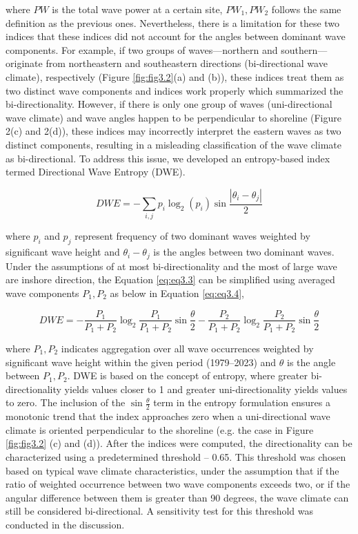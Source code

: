 where $PW$ is the total wave power at a certain site, $PW_1, PW_2$ follows the
same definition as the previous ones. Nevertheless, there is a limitation for
these two indices that these indices did not account for the angles between
dominant wave components. For example, if two groups of waves—northern and
southern—originate from northeastern and southeastern directions (bi-directional
wave climate), respectively (Figure \ref{fig:fig3.2}(a) and (b)), these indices
treat them as two distinct wave components and indices work properly which
summarized the bi-directionality. However, if there is only one group of waves
(uni-directional wave climate) and wave angles happen to be perpendicular to
shoreline (Figure 2(c) and 2(d)), these indices may incorrectly interpret the
eastern waves as two distinct components, resulting in a misleading
classification of the wave climate as bi-directional. To address this issue, we
developed an entropy-based index termed Directional Wave Entropy (DWE). 

\begin{equation}
DWE = -\sum_{i,j}p_i\log_2(p_i)\sin{\frac{|\theta_i - \theta_j|}{2}}
\label{eq:eq3.3}
\end{equation}

where $p_i$ and $p_j$ represent frequency of two dominant waves weighted by
significant wave height and $\theta_i-\theta_j$ is the angles between two
dominant waves. Under the assumptions of at most bi-directionality and the most
of large wave are inshore direction, the Equation \ref{eq:eq3.3} can be
simplified using averaged wave components $P_1,P_2$ as below in Equation
\ref{eq:eq3.4},

\begin{equation}
    DWE = - \frac{P_1}{P_1+P_2}\log_2\frac{P_1}{P_1+P_2}\sin{\frac{\theta}{2}}- \frac{P_2}{P_1+P_2}\log_2\frac{P_2}{P_1+P_2}\sin{\frac{\theta}{2}}
\label{eq:eq3.4}
\end{equation}

where $P_1, P_2$ indicates aggregation over all wave occurrences weighted by
significant wave height within the given period (1979–2023) and $\theta$ is the
angle between $P_1, P_2$. DWE is based on the concept of entropy, where greater
bi-directionality yields values closer to 1 and greater uni-directionality
yields values to zero. The inclusion of the $\sin{\frac{\theta}{2}}$ term in the
entropy formulation ensures a monotonic trend that the index approaches zero
when a uni-directional wave climate is oriented perpendicular to the shoreline
(e.g. the case in  Figure \ref{fig:fig3.2} (c) and (d)). After the indices were
computed, the directionality can be characterized using a predetermined
threshold – 0.65. This threshold was chosen based on typical wave climate
characteristics, under the assumption that if the ratio of weighted occurrence
between two wave components exceeds two, or if the angular difference between
them is greater than 90 degrees, the wave climate can still be considered
bi-directional. A sensitivity test for this threshold was conducted in the
discussion.

